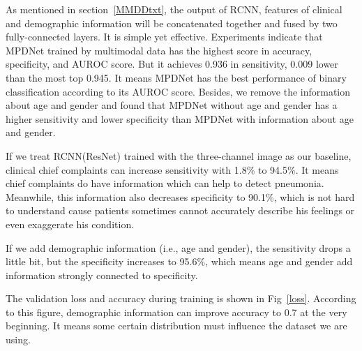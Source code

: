 \documentclass[journal]{IEEEtran}
\begin{document}
As mentioned in section~\ref{MMDDtxt}, the output of RCNN, features of clinical and demographic information will be concatenated together and fused by two fully-connected layers. It is simple yet effective. Experiments indicate that MPDNet trained by multimodal data has the highest score in accuracy, specificity, and AUROC score. But it achieves 0.936 in sensitivity, 0.009 lower than the most top 0.945. It means MPDNet has the best performance of binary classification according to its AUROC score. 
Besides, we remove the information about age and gender and found that MPDNet without age and gender has a higher sensitivity and lower specificity than MPDNet with information about age and gender. 
    
If we treat RCNN(ResNet) trained with the three-channel image as our baseline, clinical chief complaints can increase sensitivity with 1.8\% to 94.5\%. It means chief complaints do have information which can help to detect pneumonia. Meanwhile, this information also decreases specificity to 90.1\%, which is not hard to understand cause patients sometimes cannot accurately describe his feelings or even exaggerate his condition. 

If we add demographic information (i.e., age and gender), the sensitivity drops a little bit, but the specificity increases to 95.6\%, which means age and gender add information strongly connected to specificity.

The validation loss and accuracy during training is shown in Fig~\ref{loss}. According to this figure, demographic information can improve accuracy to 0.7 at the very beginning. It means some certain distribution must influence the dataset we are using. 
\end{document}
